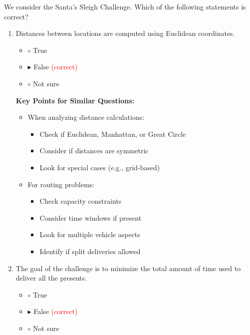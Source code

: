 We consider the Santa's Sleigh Challenge. Which of the following statements is correct?

\begin{enumerate}[label=\alph*)]
\item Distances between locations are computed using Euclidean coordinates.
\begin{itemize}
\item $\circ$ True
\item $\blacktriangleright$ False \hspace{1em} \textcolor{red}{(correct)}
\item $\circ$ Not sure
\end{itemize}

\textbf{Key Points for Similar Questions:}
\begin{itemize}
\item When analyzing distance calculations:
  \begin{itemize}
  \item Check if Euclidean, Manhattan, or Great Circle
  \item Consider if distances are symmetric
  \item Look for special cases (e.g., grid-based)
  \end{itemize}
\item For routing problems:
  \begin{itemize}
  \item Check capacity constraints
  \item Consider time windows if present
  \item Look for multiple vehicle aspects
  \item Identify if split deliveries allowed
  \end{itemize}
\end{itemize}

\item The goal of the challenge is to minimize the total amount of time used to deliver all the presents.
\begin{itemize}
\item $\circ$ True
\item $\blacktriangleright$ False \hspace{1em} \textcolor{red}{(correct)}
\item $\circ$ Not sure
\end{itemize}


\end{enumerate}

